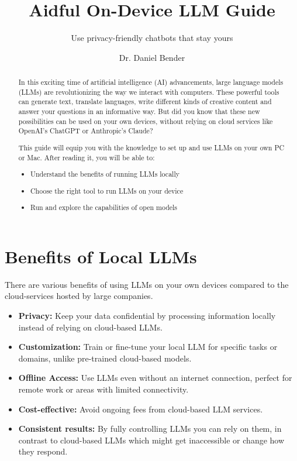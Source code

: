 \documentclass[parskip=half]{scrreprt} %
\title{Aidful On-Device LLM Guide}
\subtitle{Use privacy-friendly chatbots that stay yours}
\author{Dr. Daniel Bender}
\date{}
\begin{document}
\maketitle

\begin{abstract}
In this exciting time of artificial intelligence (AI) advancements, large language models (LLMs) are revolutionizing the way we interact with computers.
These powerful tools can generate text, translate languages, write different kinds of creative content and answer your questions in an informative way.
But did you know that these new possibilities can be used on your own devices, without relying on cloud services like OpenAI's ChatGPT or Anthropic's Claude?

This guide will equip you with the knowledge to set up and use LLMs on your own PC or Mac.
After reading it, you will be able to:
\begin{itemize}
	\item Understand the benefits of running LLMs locally
	\item Choose the right tool to run LLMs on your device
	\item Run and explore the capabilities of open models
\end{itemize}

\end{abstract}

\section{Benefits of Local LLMs}
There are various benefits of using LLMs on your own devices compared to the cloud-services hosted by large companies.
\begin{itemize}
	\item \textbf{Privacy:} Keep your data confidential by processing information locally instead of relying on cloud-based LLMs.
	\item \textbf{Customization:} Train or fine-tune your local LLM for specific tasks or domains, unlike pre-trained cloud-based models.
	\item \textbf{Offline Access:} Use LLMs even without an internet connection, perfect for remote work or areas with limited connectivity.
	\item \textbf{Cost-effective:} Avoid ongoing fees from cloud-based LLM services.
	\item \textbf{Consistent results:} By fully controlling LLMs you can rely on them, in contrast to cloud-based LLMs which might get inaccessible or change how they respond.
\end{itemize}
\end{document}
